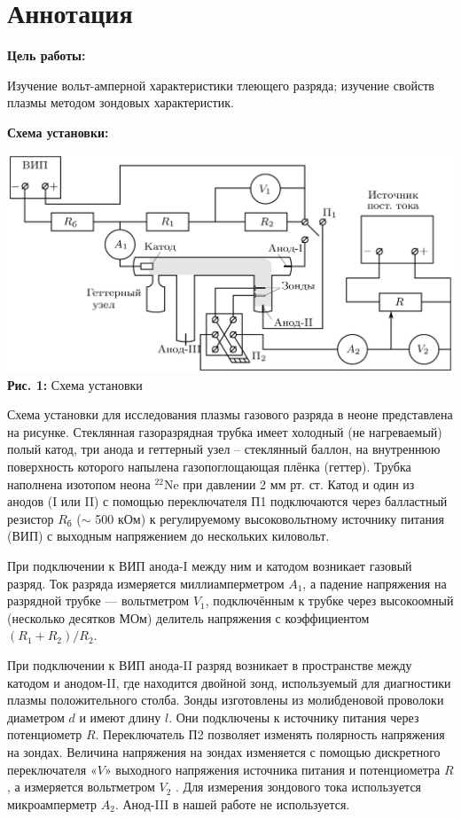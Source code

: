 \documentclass[12pt,a4paper]{scrartcl}
\begin{document}
	\section{Аннотация}
	
	\textbf{Цель работы: }
	
	Изучение вольт-амперной характеристики тлеющего разряда; изучение свойств плазмы методом зондовых характеристик.	
	
	\textbf{Схема установки:}
	\begin{center}
		\includegraphics[scale=0.17]{PIC_1.png}
		\\\textbf{Рис. 1:} Схема установки
	\end{center}
	
		Схема установки для исследования плазмы газового разряда в неоне представлена на рисунке. Стеклянная газоразрядная трубка имеет холод­ный (не нагреваемый) полый катод, три анода и геттерный узел -- стек­лянный баллон, на внутреннюю поверхность которого напылена газопо­глощающая плёнка (геттер). Трубка наполнена изотопом неона $^{22}\mathrm{Ne}$ при давлении 2 мм рт. ст. Катод и один из анодов (I или II) с помощью переключателя П1 подключаются через балластный резистор $R_{\text{б}}$ ($\sim$ 500 кОм) к регулируемому высоковольтному источнику питания (ВИП) с выходным напряжением до нескольких киловольт.

	При подключении к ВИП анода-I между ним и катодом возникает газовый разряд. Ток разряда измеряется миллиамперметром $A_1$, а паде­ние напряжения на разрядной трубке — вольтметром $V_1$, подключённым к трубке через высокоомный (несколько десятков МОм) делитель напряжения с коэффициентом $(R_1 + R_2) / R_2$.
	
	При подключении к ВИП анода-II разряд возникает в пространстве между катодом и анодом-II, где находится двойной зонд, используемый для диагностики плазмы положительного столба. Зонды изготовлены из молибденовой проволоки диаметром $d$ и имеют длину $l$. Они подклю­чены к источнику питания через потенциометр $R$. Переключатель П2 позволяет изменять полярность напряжения на зондах. Величина на­пряжения на зондах изменяется с помощью дискретного переключателя «$V$» выходного напряжения источника питания и потенциометра $R$, а измеряется вольтметром $V_2$ . Для измерения зондового тока используется микроамперметр $A_2$. Анод-III в нашей работе не используется.
\end{document}
